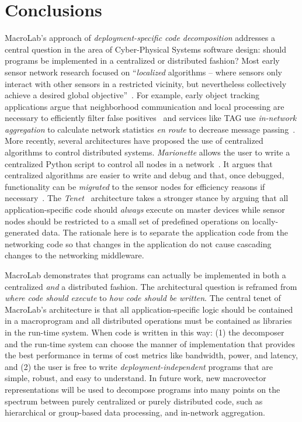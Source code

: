 \section{Conclusions} \label{conclusions}
MacroLab's approach of {\em deployment-specific code decomposition} addresses a
central question in the area of Cyber-Physical Systems software design: should programs
be implemented in a centralized or distributed fashion?  Most early sensor
network research focused on ``{\em localized} algorithms -- where sensors only
interact with other sensors in a restricted vicinity, but nevertheless
collectively achieve a desired global objective''~\cite{Estrin}.  For
example, early object tracking applications argue that neighborhood
communication and local processing are necessary to efficiently filter false
positives~\cite{Whitehousea} and services like TAG use {\em
in-network aggregation} to calculate network statistics {\em en route} to
decrease message passing~\cite{Madden}.  More recently, several
architectures have proposed the use of centralized algorithms to control
distributed systems. {\em Marionette} allows the user to write a
centralized Python script to control all nodes in a
network~\cite{Whitehouseb}.  It argues that centralized algorithms are
easier to write and debug and that, once debugged, functionality can be {\em
migrated} to the sensor nodes for efficiency reasons if
necessary~\cite{Whitehouse}. The {\em Tenet}~\cite{Gnawali} architecture
takes a stronger stance by arguing that all application-specific code should
{\em always} execute on master devices while sensor nodes should be restricted
to a small set of predefined operations on locally-generated data. The rationale
here is to separate the application code from the networking code so that
changes in the application do not cause cascading changes to the networking
middleware.

MacroLab demonstrates that programs can actually be implemented in both a
centralized {\em and} a distributed fashion. The architectural question is
reframed from {\em where code should execute} to {\em how code should be
written}.  The central tenet of MacroLab's architecture is that all
application-specific logic should be contained in a macroprogram and all
distributed operations must be contained as libraries in the run-time system.
When code is written in this way: (1) the decomposer and the run-time system can
choose the manner of implementation that provides the best performance in terms
of cost metrics like bandwidth, power, and latency, and (2) the user is free to
write {\em deployment-independent} programs that are simple, robust, and easy to
understand.  In future work, new macrovector representations will be used to
decompose programs into many points on the spectrum between purely centralized
or purely distributed code, such as hierarchical or group-based data processing,
and in-network aggregation.
